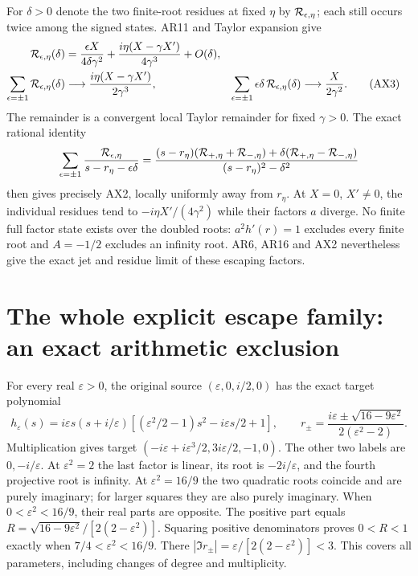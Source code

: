 \documentclass[11pt]{article}
\begin{document}
For $\delta>0$ denote the two finite-root residues at fixed
$\eta$ by $ {\cal R}_{\epsilon,\eta}$; each still occurs twice
among the signed states. AR11 and Taylor expansion give
\begin{align}
{\cal R}_{\epsilon,\eta}(\delta)
&=\frac{\epsilon X}{4\delta\gamma^2}
  +\frac{i\eta(X-\gamma X')}{4\gamma^3}+O(\delta),\nonumber\\
\sum_{\epsilon=\pm1}{\cal R}_{\epsilon,\eta}(\delta)
&\longrightarrow\frac{i\eta(X-\gamma X')}{2\gamma^3},&
\sum_{\epsilon=\pm1}\epsilon\delta\,{\cal R}_{\epsilon,\eta}(\delta)
&\longrightarrow\frac{X}{2\gamma^2}.
\tag{AX3}
\end{align}
The remainder is a convergent local Taylor remainder for fixed
$\gamma>0$. The exact rational identity
\[
\sum_{\epsilon=\pm1}\frac{{\cal R}_{\epsilon,\eta}}
 {s-r_\eta-\epsilon\delta}
=\frac{(s-r_\eta)({\cal R}_{+,\eta}+{\cal R}_{-,\eta})
       +\delta({\cal R}_{+,\eta}-{\cal R}_{-,\eta})}
       {(s-r_\eta)^2-\delta^2}
\]
then gives precisely AX2, locally uniformly away from $r_\eta$.
At $X=0$, $X'\ne0$, the individual residues tend to
$-i\eta X'/(4\gamma^2)$ while their factors $a$ diverge.
No finite full factor state exists over the doubled roots:
$a^2h'(r)=1$ excludes every finite root and $A=-1/2$ excludes
an infinity root. AR6, AR16 and AX2 nevertheless give the exact
jet and residue limit of these escaping factors.

\section{The whole explicit escape family: an exact arithmetic exclusion}
For every real $\varepsilon>0$, the original source
$(\varepsilon,0,i/2,0)$ has the exact target polynomial
\begin{equation}
h_\varepsilon(s)=i\varepsilon s(s+i/\varepsilon)
 [(\varepsilon^2/2-1)s^2-i\varepsilon s/2+1],\qquad
r_\pm=\frac{i\varepsilon\pm\sqrt{16-9\varepsilon^2}}
                 {2(\varepsilon^2-2)}.
\tag{AX4}
\end{equation}
Multiplication gives target
$(-i\varepsilon+i\varepsilon^3/2,3i\varepsilon/2,-1,0)$.
The other two labels are $0,-i/\varepsilon$.
At $\varepsilon^2=2$ the last factor is linear, its root is
$-2i/\varepsilon$, and the fourth projective root is infinity.
At $\varepsilon^2=16/9$ the two quadratic roots coincide
and are purely imaginary; for larger squares they are also
purely imaginary. When $0<\varepsilon^2<16/9$, their real
parts are opposite. The positive part equals
$R=\sqrt{16-9\varepsilon^2}/[2(2-\varepsilon^2)]$.
Squaring positive denominators proves $0<R<1$ exactly when
$7/4<\varepsilon^2<16/9$. There
$|\Im r_\pm|=\varepsilon/[2(2-\varepsilon^2)]<3$.
This covers all parameters, including changes of degree
and multiplicity.
\end{document}
